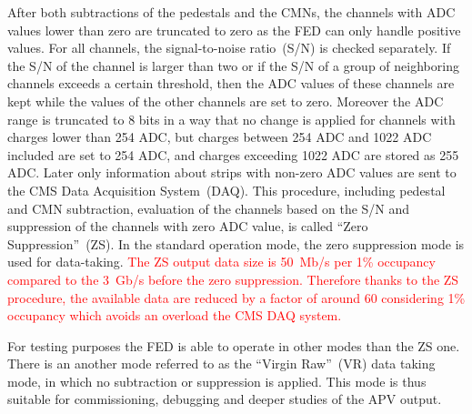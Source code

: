 After both subtractions of the pedestals and the CMNs, the channels with ADC values lower than zero are truncated to zero as the FED can only handle positive values. For all channels, the signal-to-noise ratio~(S/N) is checked separately. If the S/N of the channel is larger than two or if the S/N of a group of neighboring channels exceeds a certain threshold, then the ADC values of these channels are kept while the values of the other channels are set to zero. Moreover the ADC range is truncated to 8 bits in a way that no change is applied for channels with charges lower than 254 ADC, but charges between 254 ADC and 1022 ADC included are set to 254 ADC, and charges exceeding 1022 ADC are stored as 255 ADC. Later only information about strips with non-zero ADC values are sent to the CMS Data Acquisition System~(DAQ).  This procedure, including pedestal and CMN subtraction, evaluation of the channels based on the S/N and suppression of the channels with zero ADC value, is called ``Zero Suppression''~(ZS). In the standard operation mode, the zero suppression mode is used for data-taking. \textcolor{red}{The ZS output data size is 50~Mb/s per 1\% occupancy compared to the 3~Gb/s before the zero suppression. Therefore thanks to the ZS procedure, the available data are reduced by a factor of around 60 considering 1\% occupancy which avoids an overload the CMS DAQ system.}

For testing purposes the FED is able to operate in other modes than the ZS one. There is an another mode referred to as the ``Virgin Raw''~(VR) data taking mode, in which no subtraction or suppression is applied. This mode is thus suitable for commissioning, debugging and deeper studies of the APV output.





